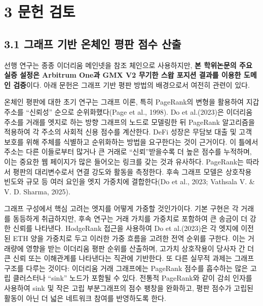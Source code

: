 \clearpage
{}
\section*{3 \textbf{문헌 검토}}
\label{sec:literature-review}

\subsection*{3.1 그래프 기반 온체인 평판 점수 산출}
\label{sec:graph-based-on-chain-reputation-scoring}

선행 연구는 종종 이더리움 메인넷을 참조 체인으로 사용하지만, \textbf{본 학위논문의 주요 실증 설정은 Arbitrum One과 GMX V2 무기한 스왑 포지션 결과를 이용한 도메인 검증}이다. 아래 문헌은 그래프 기반 평판 방법의 배경으로서 여전히 관련이 있다.

온체인 평판에 대한 초기 연구는 그래프 이론, 특히 PageRank의 변형을 활용하여 지갑 주소를 ``신뢰성'' 순으로 순위화했다(Page et al., 1998). Do et al.(2023)은 이더리움 주소를 거래를 엣지로 하는 방향 그래프의 노드로 모델링한 뒤 PageRank 알고리즘을 적용하여 각 주소의 사회적 신용 점수를 계산한다. DeFi 성장은 무담보 대출 및 고객 보호를 위해 주체를 식별하고 순위화하는 방법을 요구한다는 것이 근거이다. 이 틀에서 주소는 다른 이들로부터 많거나 큰 거래로 ``신뢰''받을수록 더 높은 점수를 누적하며, 이는 중요한 웹 페이지가 많은 들어오는 링크를 갖는 것과 유사하다. PageRank는 따라서 평판의 대리변수로서 연결 강도와 활동을 측정한다. 후속 그래프 모델은 상호작용 빈도와 규모 등 여러 요인을 엣지 가중치에 결합한다(Do et al., 2023; Vathsala V. \& V. D. Sharma, 2025).


그래프 구성에서 핵심 고려는 엣지를 어떻게 가중할 것인가이다. 기본 구현은 각 거래를 동등하게 취급하지만, 후속 연구는 거래 가치를 가중치로 포함하여 큰 송금이 더 강한 신뢰를 나타낸다. HodgeRank 접근을 사용하여 Do et al.(2023)은 각 엣지에 이전된 ETH 양을 가중치로 두고 이러한 가중 흐름을 고려한 전역 순위를 구한다. 이는 거래량에 영향을 받는 이더리움 평판 순위를 산출하며, 고가치 상호작용이 당사자 간 더 큰 신뢰 또는 이해관계를 나타낸다는 직관에 기반한다. 또 다른 실무적 과제는 그래프 구조를 다루는 것이다: 이더리움 거래 그래프에는 PageRank 점수를 흡수하는 많은 고립 클러스터나 ``sink'' 노드가 포함될 수 있다. 전통적 PageRank와 같이 감쇠 인자를 사용하여 sink 및 작은 고립 부분그래프의 점수 팽창을 완화하고, 평판 점수가 고립된 활동이 아닌 더 넓은 네트워크 참여를 반영하도록 한다.



